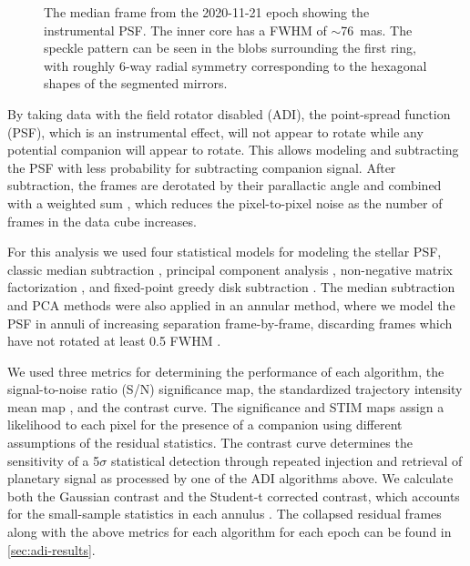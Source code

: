 \documentclass[twocolumn]{aastex631}
\begin{document}
\begin{figure}
    \centering
    \caption{The median frame from the 2020-11-21 epoch showing the instrumental PSF. The inner core has a FWHM of $\sim$\qty{76}{mas}. The speckle pattern can be seen in the blobs surrounding the first ring, with roughly 6-way radial symmetry corresponding to the hexagonal shapes of the segmented mirrors.}
    \label{fig:psf}
\end{figure}

By taking data with the field rotator disabled (ADI), the point-spread function (PSF), which is an instrumental effect, will not appear to rotate while any potential companion will appear to rotate. This allows modeling and subtracting the PSF with less probability for subtracting companion signal. After subtraction, the frames are derotated by their parallactic angle and combined with a weighted sum \citep{bottom_noise-weighted_2017}, which reduces the pixel-to-pixel noise as the number of frames in the data cube increases.

For this analysis we used four statistical models for modeling the stellar PSF, classic median subtraction \citep{marois_angular_2006}, principal component analysis \citep[PCA;][]{soummer_detection_2012}, non-negative matrix factorization \citep[NMF;][]{ren_non-negative_2018}, and fixed-point greedy disk subtraction \citep[GreeDS;][]{pairet_reference-less_2019,pairet_mayonnaise_2020}. The median subtraction and PCA methods were also applied in an annular method, where we model the PSF in annuli of increasing separation frame-by-frame, discarding frames which have not rotated at least 0.5 FWHM \citep{marois_angular_2006}.

We used three metrics for determining the performance of each algorithm, the signal-to-noise ratio (S/N) significance map, the standardized trajectory intensity mean map \citep[STIM map;][]{pairet_stim_2019}, and the contrast curve. The significance and STIM maps assign a likelihood to each pixel for the presence of a companion using different assumptions of the residual statistics. The contrast curve determines the sensitivity of a 5$\sigma$ statistical detection through repeated injection and retrieval of planetary signal as processed by one of the ADI algorithms above. We calculate both the Gaussian contrast and the Student-t corrected contrast, which accounts for the small-sample statistics in each annulus \citep{mawet_fundamental_2014}. The collapsed residual frames along with the above metrics for each algorithm for each epoch can be found in \autoref{sec:adi-results}.
\end{document}
